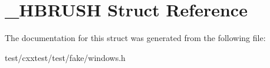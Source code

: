 \hypertarget{struct__HBRUSH}{\section{\-\_\-\-H\-B\-R\-U\-S\-H Struct Reference}
\label{struct__HBRUSH}
}


The documentation for this struct was generated from the following file\-:\begin{DoxyCompactItemize}
\item 
test/cxxtest/test/fake/windows.\-h\end{DoxyCompactItemize}
